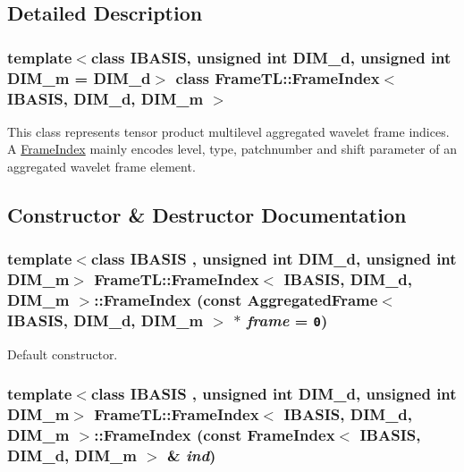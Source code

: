\subsection{Detailed Description}
\subsubsection*{template$<$class IBASIS, unsigned int DIM\_\-d, unsigned int DIM\_\-m = DIM\_\-d$>$ class FrameTL::FrameIndex$<$ IBASIS, DIM\_\-d, DIM\_\-m $>$}

This class represents tensor product multilevel aggregated wavelet frame indices. A \hyperlink{classFrameTL_1_1FrameIndex}{FrameIndex} mainly encodes level, type, patchnumber and shift parameter of an aggregated wavelet frame element. 

\subsection{Constructor \& Destructor Documentation}
\hypertarget{classFrameTL_1_1FrameIndex_3a0967cbcfddd03202189f8610f890c2}{
\subsubsection[{FrameIndex}]{\setlength{\rightskip}{0pt plus 5cm}template$<$class IBASIS , unsigned int DIM\_\-d, unsigned int DIM\_\-m$>$ {\bf FrameTL::FrameIndex}$<$ IBASIS, DIM\_\-d, DIM\_\-m $>$::{\bf FrameIndex} (const {\bf AggregatedFrame}$<$ IBASIS, DIM\_\-d, DIM\_\-m $>$ $\ast$ {\em frame} = {\tt 0})}}
\label{classFrameTL_1_1FrameIndex_3a0967cbcfddd03202189f8610f890c2}


Default constructor. \hypertarget{classFrameTL_1_1FrameIndex_d4115fc6eafd1487e0ee6c38f21f7cdc}{
\subsubsection[{FrameIndex}]{\setlength{\rightskip}{0pt plus 5cm}template$<$class IBASIS , unsigned int DIM\_\-d, unsigned int DIM\_\-m$>$ {\bf FrameTL::FrameIndex}$<$ IBASIS, DIM\_\-d, DIM\_\-m $>$::{\bf FrameIndex} (const {\bf FrameIndex}$<$ IBASIS, DIM\_\-d, DIM\_\-m $>$ \& {\em ind})}}
\label{classFrameTL_1_1FrameIndex_d4115fc6eafd1487e0ee6c38f21f7cdc}


